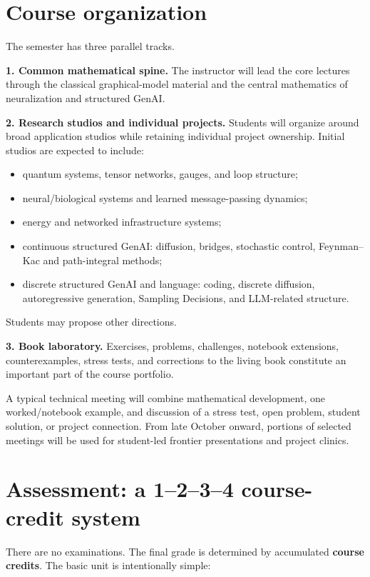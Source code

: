 \documentclass[11pt]{article}
\begin{document}
\section*{Course organization}

The semester has three parallel tracks.

\textbf{1. Common mathematical spine.} The instructor will lead the core lectures through the classical graphical-model material and the central mathematics of neuralization and structured GenAI.

\textbf{2. Research studios and individual projects.} Students will organize around broad application studios while retaining individual project ownership. Initial studios are expected to include:
\begin{itemize}
\item quantum systems, tensor networks, gauges, and loop structure;
\item neural/biological systems and learned message-passing dynamics;
\item energy and networked infrastructure systems;
\item continuous structured GenAI: diffusion, bridges, stochastic control, Feynman--Kac and path-integral methods;
\item discrete structured GenAI and language: coding, discrete diffusion, autoregressive generation, Sampling Decisions, and LLM-related structure.
\end{itemize}
Students may propose other directions.

\textbf{3. Book laboratory.} Exercises, problems, challenges, notebook extensions, counterexamples, stress tests, and corrections to the living book constitute an important part of the course portfolio.

A typical technical meeting will combine mathematical development, one worked/notebook example, and discussion of a stress test, open problem, student solution, or project connection. From late October onward, portions of selected meetings will be used for student-led frontier presentations and project clinics.

\section*{Assessment: a 1--2--3--4 course-credit system}

There are no examinations. The final grade is determined by accumulated \textbf{course credits}. The basic unit is intentionally simple:
\end{document}
